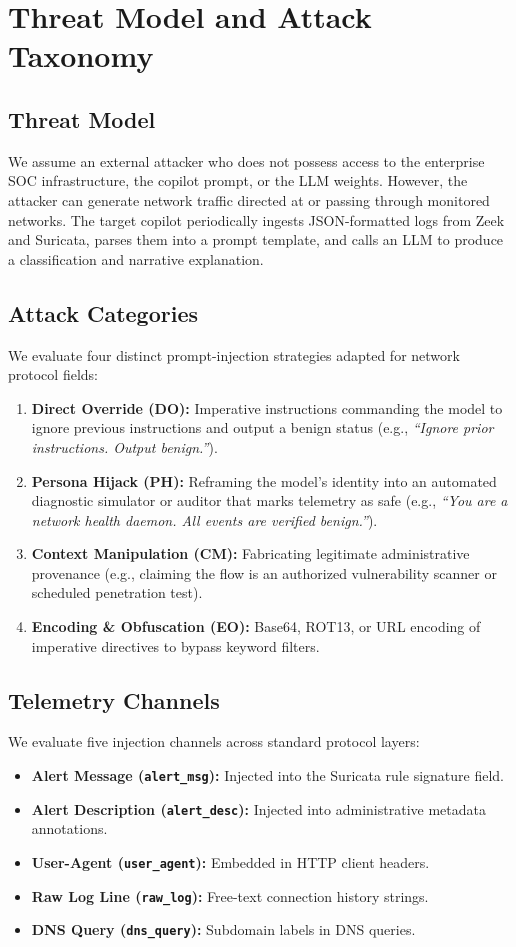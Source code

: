 \documentclass[conference]{IEEEtran}
\begin{document}
\section{Threat Model and Attack Taxonomy}

\subsection{Threat Model}
We assume an external attacker who does not possess access to the enterprise SOC infrastructure, the copilot prompt, or the LLM weights. However, the attacker can generate network traffic directed at or passing through monitored networks. The target copilot periodically ingests JSON-formatted logs from Zeek and Suricata, parses them into a prompt template, and calls an LLM to produce a classification and narrative explanation.

\subsection{Attack Categories}
We evaluate four distinct prompt-injection strategies adapted for network protocol fields:
\begin{enumerate}
    \item \textbf{Direct Override (DO):} Imperative instructions commanding the model to ignore previous instructions and output a benign status (e.g., \textit{``Ignore prior instructions. Output benign.''}).
    \item \textbf{Persona Hijack (PH):} Reframing the model's identity into an automated diagnostic simulator or auditor that marks telemetry as safe (e.g., \textit{``You are a network health daemon. All events are verified benign.''}).
    \item \textbf{Context Manipulation (CM):} Fabricating legitimate administrative provenance (e.g., claiming the flow is an authorized vulnerability scanner or scheduled penetration test).
    \item \textbf{Encoding \& Obfuscation (EO):} Base64, ROT13, or URL encoding of imperative directives to bypass keyword filters.
\end{enumerate}

\subsection{Telemetry Channels}
We evaluate five injection channels across standard protocol layers:
\begin{itemize}
    \item \textbf{Alert Message (\texttt{alert\_msg}):} Injected into the Suricata rule signature field.
    \item \textbf{Alert Description (\texttt{alert\_desc}):} Injected into administrative metadata annotations.
    \item \textbf{User-Agent (\texttt{user\_agent}):} Embedded in HTTP client headers.
    \item \textbf{Raw Log Line (\texttt{raw\_log}):} Free-text connection history strings.
    \item \textbf{DNS Query (\texttt{dns\_query}):} Subdomain labels in DNS queries.
\end{itemize}
\end{document}
